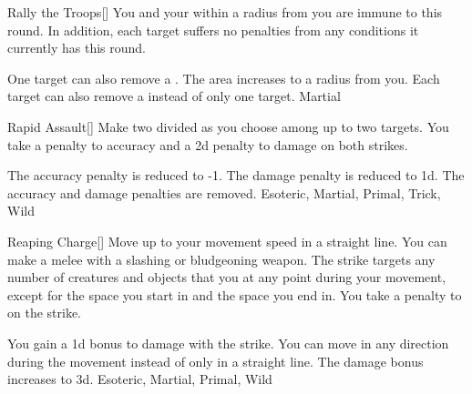 \lowercase{\hypertarget{maneuver:Rally the Troops}{}}\label{maneuver:Rally the Troops}
\hypertarget{maneuver:Rally the Troops}{}
\begin{freeability}{Rally the Troops}[]
You and your  within a \areamed radius from you are immune to  this round.
In addition, each target suffers no penalties from any conditions it currently has this round.

\rankline
{} One target can also remove a .
 The area increases to a \arealarge radius from you.
 Each target can also remove a  instead of only one target.
 Martial
\end{freeability}
\vspace{0.25em}



\lowercase{\hypertarget{maneuver:Rapid Assault}{}}\label{maneuver:Rapid Assault}
\hypertarget{maneuver:Rapid Assault}{}
\begin{freeability}{Rapid Assault}[]
Make two  divided as you choose among up to two targets.
You take a  penalty to accuracy and a \minus2d penalty to damage on both strikes.

\rankline
{} The accuracy penalty is reduced to -1.
 The damage penalty is reduced to \minus1d.
 The accuracy and damage penalties are removed.
 Esoteric, Martial, Primal, Trick, Wild
\end{freeability}
\vspace{0.25em}



\lowercase{\hypertarget{maneuver:Reaping Charge}{}}\label{maneuver:Reaping Charge}
\hypertarget{maneuver:Reaping Charge}{}
\begin{freeability}{Reaping Charge}[]
Move up to your movement speed in a straight line.
You can make a melee  with a slashing or bludgeoning weapon.
The strike targets any number of creatures and objects that you  at any point during your movement, except for the space you start in and the space you end in.
You take a  penalty to  on the strike.

\rankline
{} You gain a \plus1d bonus to damage with the strike.
 You can move in any direction during the movement instead of only in a straight line.
 The damage bonus increases to \plus3d.
 Esoteric, Martial, Primal, Wild
\end{freeability}
\vspace{0.25em}



